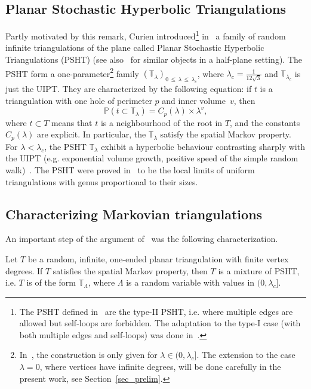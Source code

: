 \documentclass[AHL,Unicode,longabstracts,published]{cedram}
\newcommand{\TT}{\mathbb{T}}
\renewcommand{\P}{\mathbb{P}}
\begin{document}
\subsection*{Planar Stochastic Hyperbolic Triangulations}
Partly motivated by this remark, Curien introduced\footnote{The PSHT defined in~\cite{CurPSHIT} are the type-II PSHT, i.e. where multiple edges are allowed but self-loops are forbidden. The adaptation to the type-I case (with both multiple edges and self-loops) was done in~\cite{B16}.} in~\cite{CurPSHIT} a family of random infinite triangulations of the plane called Planar Stochastic Hyperbolic Triangulations (PSHT) (see also~\cite{AR13} for similar objects in a half-plane setting). The PSHT form a one-parameter\footnote{In~\cite{CurPSHIT,B16}, the construction is only given for $\lambda \in (0,\lambda_c]$. The extension to the case $\lambda=0$, where vertices have infinite degrees, will be done carefully in the present work, see Section~\ref{sec_prelim}.} family $(\TT_{\lambda})_{0\,\leq\,\lambda\,\leq\,\lambda_c}$, where $\lambda_c=\frac{1}{12\sqrt{3}}$ and $\TT_{\lambda_c}$ is just the UIPT. They are characterized by the following equation: if $t$ is a triangulation with one hole of perimeter $p$ and inner volume~$v$, then
\[
\P \left(t \subset \TT_{\lambda} \right) = C_p(\lambda) \times \lambda^v,
\]
where $t \subset T$ means that $t$ is a neighbourhood of the root in $T$, and the constants $C_p(\lambda)$ are explicit. In particular, the $\TT_{\lambda}$ satisfy the spatial Markov property. For $\lambda<\lambda_c$, the PSHT $\TT_{\lambda}$ exhibit a hyperbolic behaviour contrasting sharply with the UIPT (e.g. exponential volume growth, positive speed of the simple random walk)~\cite{CurPSHIT}. The PSHT were proved in~\cite{BL19} to be the local limits of uniform triangulations with genus proportional to their sizes.

\subsection*{Characterizing Markovian triangulations}
An important step of the argument of~\cite{BL19} was the following characterization.

\begin{prop}
\cite[Theorem~2]{BL19}\label{prop_oneended_case}
Let $T$ be a random, infinite, one-ended planar triangulation with finite vertex degrees. If $T$ satisfies the spatial Markov property, then $T$ is a mixture of PSHT, i.e. $T$ is of the form $\TT_{\Lambda}$, where $\Lambda$ is a random variable with values in $(0,\lambda_c]$.
\end{prop}
\end{document}
